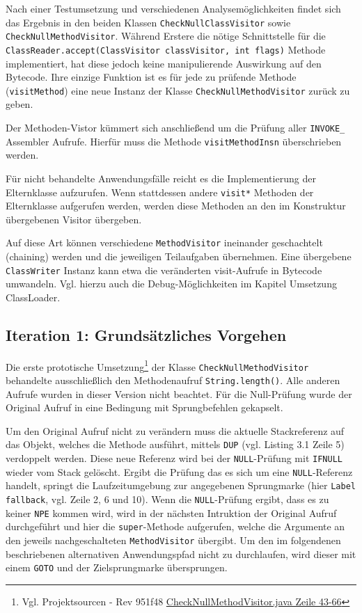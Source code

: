 Nach einer Testumsetzung und verschiedenen Analysemöglichkeiten findet sich
das Ergebnis in den beiden Klassen \texttt{CheckNullClassVisitor} sowie
\texttt{CheckNullMethodVisitor}. Während Erstere die nötige Schnittstelle für die
\texttt{ClassReader.accept(ClassVisitor classVisitor, int flags)} Methode implementiert,
hat diese jedoch keine manipulierende Auswirkung auf den Bytecode. Ihre
einzige Funktion ist es für jede zu prüfende Methode (\texttt{visitMethod})
eine neue Instanz der Klasse \texttt{CheckNullMethodVisitor} zurück zu geben.

Der Methoden-Vistor kümmert sich anschließend um die Prüfung aller \texttt{INVOKE\_\*}
Assembler Aufrufe. Hierfür muss die Methode \texttt{visitMethodInsn} überschrieben werden.

Für nicht behandelte Anwendungsfälle reicht es die Implementierung der Elternklasse
aufzurufen. Wenn stattdessen andere \texttt{visit*} Methoden der Elternklasse aufgerufen
werden, werden diese Methoden an den im Konstruktur übergebenen Visitor übergeben.

Auf diese Art können verschiedene \texttt{MethodVisitor} ineinander geschachtelt
(chaining) werden und die jeweiligen Teilaufgaben übernehmen. Eine übergebene \texttt{ClassWriter}
Instanz kann etwa die veränderten visit-Aufrufe in Bytecode umwandeln. Vgl. hierzu
auch die Debug-Möglichkeiten im Kapitel Umsetzung ClassLoader.

\subsection{Iteration 1: Grundsätzliches Vorgehen}

Die erste prototische Umsetzung\footnote{Vgl. Projektsourcen - Rev 951f48 {\href{https://github.com/jerolimov/java-hardener/blob/951f48194f53baebd0915c01e0ed3cc2596bd0db/src/main/java/de/fhkoeln/gm/cui/javahardener/CheckNullMethodVisitor.java\#L43-66}{CheckNullMethodVisitor.java Zeile 43-66}}} der Klasse \texttt{CheckNullMethodVisitor} behandelte ausschließlich
den Methodenaufruf \texttt{String.length()}. Alle anderen Aufrufe wurden
in dieser Version nicht beachtet. Für die Null-Prüfung wurde der Original Aufruf
in eine Bedingung mit Sprungbefehlen gekapselt.

Um den Original Aufruf nicht zu verändern muss die aktuelle Stackreferenz
auf das Objekt, welches die Methode ausführt, mittels \texttt{DUP} (vgl. Listing 3.1 Zeile 5)
verdoppelt werden. Diese neue Referenz wird bei der \texttt{NULL}-Prüfung mit
\texttt{IFNULL} wieder vom Stack gelöscht. Ergibt die Prüfung das es sich um
eine \texttt{NULL}-Referenz handelt, springt die Laufzeitumgebung zur
angegebenen Sprungmarke (hier \texttt{Label fallback}, vgl. Zeile 2, 6 und 10).
Wenn die \texttt{NULL}-Prüfung ergibt, dass es zu keiner \texttt{NPE} kommen
wird, wird in der nächsten Intruktion der Original Aufruf durchgeführt
und hier die \texttt{super}-Methode aufgerufen, welche die Argumente an den jeweils
nachgeschalteten \texttt{MethodVisitor} übergibt.
Um den im folgendenen beschriebenen alternativen Anwendungspfad nicht
zu durchlaufen, wird dieser mit einem \texttt{GOTO} und der Zielsprungmarke
übersprungen.

